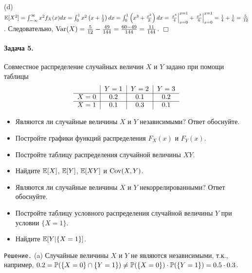 \documentclass[12pt, a4paper]{article}\usepackage[]{graphicx}\usepackage[]{color}
\begin{document}
(d) $\E[X^2] = \int_{-\infty}^{\infty}x^2f_X(x)dx = \int_{0}^{1}x^2\left(x+\tfrac{1}{2}\right)dx = \int_{0}^{1}\left(x^3+\tfrac{x^2}{2}\right)dx = \left.\tfrac{x^4}{4}\right|_{x=0}^{x=1} + \left.\tfrac{x^3}{6}\right|_{x=0}^{x=1} = \tfrac{1}{4} + \tfrac{1}{6} = \tfrac{5}{12}$.
Следовательно, $\Var(X) = \tfrac{5}{12} - \tfrac{49}{144} = \tfrac{60-49}{144} = \tfrac{11}{144}$. $\Box$
\paragraph{Задача 5.}
Совместное распределение случайных величин $X$ и $Y$ задано при помощи таблицы
\[
\begin{tabular}{c|c|c|c}
  {}     & $Y=1$   & $Y=2$   & $Y=3$ \\ \cline{1-4}
  $X=0$  & $0.2$   & $0.1$   & $0.2$ \\ \cline{1-4}
  $X=1$  & $0.1$   & $0.3$   & $0.1$ \\
\end{tabular}
\]
\begin{itemize}
  \item[(a)] Являются ли случайные величины $X$ и $Y$ независимыми? Ответ обоснуйте.
  \item[(b)] Постройте графики функций распределения $F_X(x)$ и $F_Y(x)$.
  \item[(c)] Постройте таблицу распределения случайной величины $XY$.
  \item[(d)] Найдите $\E[X]$, $\E[Y]$, $\E[XY]$ и $\Cov(X,Y)$.
  \item[(e)] Являются ли случайные величины $X$ и $Y$ некоррелированными? Ответ обоснуйте.
  \item[(f)] Постройте таблицу условного распределения случайной величины $Y$ при условии $\{X = 1\}$.
  \item[(g)] Найдите $\E[Y|\{X = 1\}]$.
\end{itemize}

\verb"Решение." (a) Случайные величины $X$ и $Y$ не являются независимыми, т.к., например, $0.2 = \P(\{X=0\} \cap \{Y=1\}) \not= \P(\{X=0\}) \cdot \P(\{Y=1\}) = 0.5 \cdot 0.3$.
\end{document}
